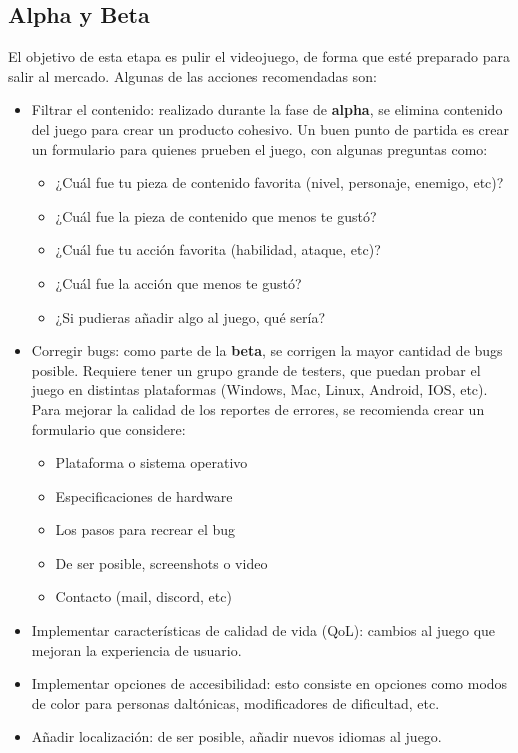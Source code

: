 \subsection{Alpha y Beta}
El objetivo de esta etapa es pulir el videojuego, de forma que esté preparado para salir al mercado. Algunas de las acciones recomendadas son:
\begin{itemize}
  \item Filtrar el contenido: realizado durante la fase de \textbf{alpha}, se elimina contenido del juego para crear un producto cohesivo. Un buen punto de partida es crear un formulario para quienes prueben el juego, con algunas preguntas como:
    \begin{itemize}
      \item ¿Cuál fue tu pieza de contenido favorita (nivel, personaje, enemigo, etc)?
      \item ¿Cuál fue la pieza de contenido que menos te gustó?
      \item ¿Cuál fue tu acción favorita (habilidad, ataque, etc)?
      \item ¿Cuál fue la acción que menos te gustó?
      \item ¿Si pudieras añadir algo al juego, qué sería?
    \end{itemize}
  \item Corregir bugs: como parte de la \textbf{beta}, se corrigen la mayor cantidad de bugs posible. Requiere tener un grupo grande de testers, que puedan probar el juego en distintas plataformas (Windows, Mac, Linux, Android, IOS, etc). Para mejorar la calidad de los reportes de errores, se recomienda crear un formulario que considere:
    \begin{itemize}
      \item Plataforma o sistema operativo
      \item Especificaciones de hardware
      \item Los pasos para recrear el bug
      \item De ser posible, screenshots o video
      \item Contacto (mail, discord, etc)
    \end{itemize}
  \item Implementar características de calidad de vida (QoL): cambios al juego que mejoran la experiencia de usuario.
  \item Implementar opciones de accesibilidad: esto consiste en opciones como modos de color para personas daltónicas, modificadores de dificultad, etc.
  \item Añadir localización: de ser posible, añadir nuevos idiomas al juego.
\end{itemize}
%
%
